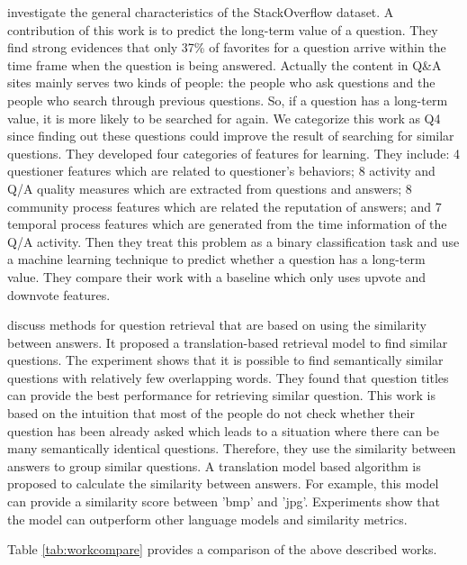 \cite{anderson2012discovering} investigate the general characteristics of the StackOverflow dataset. A contribution of this work is to predict the long-term value of a question. They find strong evidences that only 37\% of favorites for a question arrive within the time frame when the question is being answered. Actually the content in Q\&A sites mainly serves two kinds of people: the people who ask questions and the people who search through previous questions. So, if a question has a long-term value, it is more likely to be searched for again. We categorize this work as Q4 since finding out these questions could improve the result of searching for similar questions. 
They developed four categories of features for learning. They include: 4 questioner features which are related to questioner's behaviors; 8 activity and Q/A quality measures which are extracted from questions and answers; 8 community process features which are related the reputation of answers; and 7 temporal process features which are generated from the time information of the Q/A activity.
Then they treat this problem as a binary classification task and use a machine learning technique to predict whether a question has a long-term value. They compare their work with a baseline which only uses upvote and downvote features. 

\cite{chp2jeon2005finding}
discuss methods for question retrieval that are based on using the similarity between answers. It proposed a translation-based retrieval model to find similar questions. The experiment shows that it is possible to find semantically similar questions with relatively few overlapping words.
They found that question titles can provide the best performance for retrieving similar question. This work is based on the intuition that most of the people do not check whether their question has been already asked which leads to a situation where there can be many semantically identical questions. Therefore, they use the similarity between answers to group similar questions. A translation model based algorithm is proposed to calculate the similarity between answers. For example, this model can provide a similarity score between 'bmp' and 'jpg'. Experiments show that the model can outperform other language models and similarity metrics. 

Table \ref{tab:workcompare} provides a comparison of the above described works.

